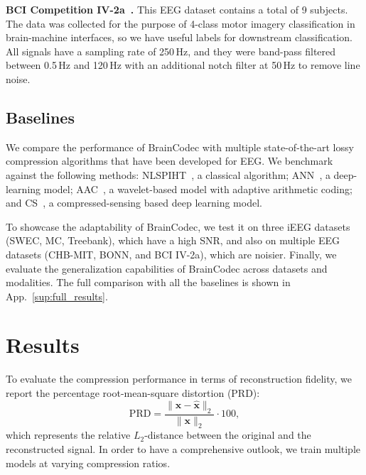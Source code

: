 \documentclass{article} %
\begin{document}
\textbf{BCI Competition IV-2a~\citep{Tangermann2012}.} This EEG dataset contains a total of 9 subjects. The data was collected for the purpose of 4-class motor imagery classification in brain-machine interfaces, so we have useful labels for downstream classification. All signals have a sampling rate of 250\,Hz, and they were band-pass filtered between 0.5\,Hz and 120\,Hz with an additional notch filter at 50\,Hz to remove line noise. 

\subsection{Baselines}

We compare the performance of BrainCodec with multiple state-of-the-art lossy compression algorithms that have been developed for EEG. We benchmark against the following methods: NLSPIHT~\citep{Xu2015}, a classical algorithm; ANN~\citep{Hejrati2017}, a deep-learning model; AAC~\citep{Nguyen2017}, a wavelet-based model with adaptive arithmetic coding; and CS~\citep{Du2024}, a compressed-sensing based deep learning model.

To showcase the adaptability of BrainCodec, we test it on three iEEG datasets (SWEC, MC, Treebank), which have a high SNR, and also on multiple EEG datasets (CHB-MIT, BONN, and BCI IV-2a), which are noisier. Finally, we evaluate the generalization capabilities of BrainCodec across datasets and modalities. The full comparison with all the baselines is shown in App.~\ref{sup:full_results}.

\section{Results}

To evaluate the compression performance in terms of reconstruction fidelity, we report the percentage root-mean-square distortion (PRD):
\begin{equation}
    \text{PRD} = \frac{\| \bm{x} - \hat{\bm{x}} \|_2}{\| \bm{x} \|_2} \cdot 100, 
\end{equation}
which represents the relative $L_2$-distance between the original and the reconstructed signal. In order to have a comprehensive outlook, we train multiple models at varying compression ratios.
\end{document}
